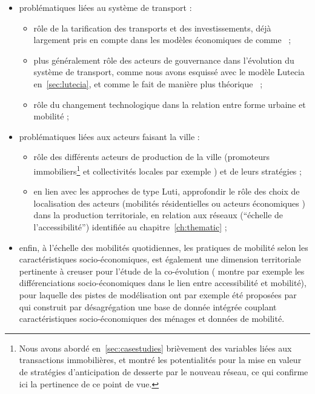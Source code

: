 {\begin{itemize}
	\item problématiques liées au système de transport :
	\begin{itemize}
	\item rôle de la tarification des transports et des investissements, déjà largement pris en compte dans les modèles économiques de  comme~\cite{levinson2007co} ;
	\item plus généralement rôle des acteurs de gouvernance dans l'évolution du système de transport, comme nous avons esquissé avec le modèle Lutecia en~\ref{sec:lutecia}, et comme le fait de manière plus théorique~\cite{Xie2011} ;
	\item rôle du changement technologique dans la relation entre forme urbaine et mobilité \cite{brotchie1984technological} ;
	\end{itemize}
	\item problématiques liées aux acteurs faisant la ville :
	\begin{itemize}
	\item rôle des différents acteurs de production de la ville (promoteurs immobiliers\footnote{Nous avons abordé en~\ref{sec:casestudies} brièvement des variables liées aux transactions immobilières, et montré les potentialités pour la mise en valeur de stratégies d'anticipation de desserte par le nouveau réseau, ce qui confirme ici la pertinence de ce point de vue.} et collectivités locales par exemple \cite{le2010acteurs}) et de leurs stratégies ;
	\item en lien avec les approches de type Luti, approfondir le rôle des choix de localisation des acteurs (mobilités résidentielles ou acteurs économiques \cite{tannier2003trois}) dans la production territoriale, en relation aux réseaux (``échelle de l'accessibilité'') identifiée au chapitre~\ref{ch:thematic} ;
	\end{itemize}
	\item enfin, à l'échelle des mobilités quotidiennes, les pratiques de mobilité selon les caractéristiques socio-économiques, est également une dimension territoriale pertinente à creuser pour l'étude de la co-évolution (\cite{cerqueira2017inegalites} montre par exemple les différenciations socio-économiques dans le lien entre accessibilité et mobilité), pour laquelle des pistes de modélisation ont par exemple été proposées par~\cite{morency2005contributions} qui construit par désagrégation une base de donnée intégrée couplant caractéristiques socio-économiques des ménages et données de mobilité.
\end{itemize}
}


